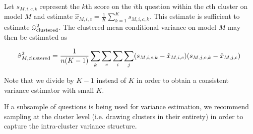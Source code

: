 \documentclass[11pt, oneside]{article}   	%
\begin{document}
Let $s_{M, i, c, k}$ represent the $k$th score on the $i$th question within the $c$th cluster on model $M$ and estimate $\hat{x}_{M, i, c}=\frac{1}{K}\sum_{k=1}^K s_{M, i, c, k}$. This estimate is sufficient to estimate $\hat{\omega}_{\rm clustered}^2$. The clustered mean conditional variance on model $M$ may then be estimated as

\[
\hat{\sigma}_{M, {\rm clustered}}^2=\frac{1}{n(K-1)}\sum_k \sum_c \sum_i \sum_j (s_{M, i, c, k}-\hat{x}_{M, i, c})(s_{M, j, c, k}-\hat{x}_{M, j, c})
\]

Note that we divide by $K-1$ instead of $K$ in order to obtain a consistent variance estimator with small $K$.

If a subsample of questions is being used for variance estimation, we recommend sampling at the cluster level (i.e. drawing clusters in their entirety) in order to capture the intra-cluster variance structure.
\end{document}
